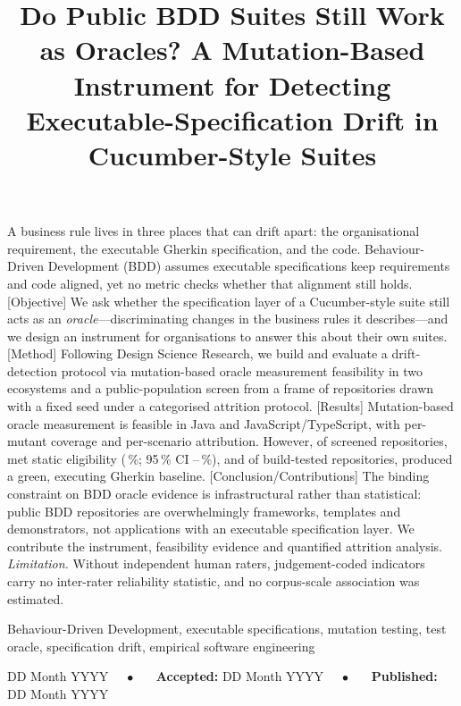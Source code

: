 \documentclass[english]{sbc2025}
\title[BDD Suites as Oracles]{Do Public BDD Suites Still Work as Oracles?
A Mutation-Based Instrument for Detecting Executable-Specification Drift in
Cucumber-Style Suites}
\author[Anonymous submission]{%
\affil{\textbf{Anonymous submission --- author identities withheld for review}}%
}
\renewcommand{\_}{\origtextunderscore\allowbreak}
\begin{document}
\begin{frontmatter}

\maketitle

\begin{abstract-en}
[Context] A business rule lives in three places that can drift apart: the organisational requirement,
the executable Gherkin specification, and the code. Behaviour-Driven Development (BDD) assumes
executable specifications keep requirements and code aligned, yet no metric checks whether that
alignment still holds. [Objective] We ask whether the specification layer of a Cucumber-style suite
still acts as an \emph{oracle}---discriminating changes in the business rules it describes---and we
design an instrument for organisations to answer this about their own suites. [Method] Following
Design Science Research, we build and evaluate a drift-detection protocol via mutation-based oracle
measurement feasibility in two ecosystems and a public-population screen from a frame of \Nframe{}
repositories drawn with a fixed seed under a categorised attrition protocol.
[Results] Mutation-based oracle measurement is feasible in Java and JavaScript/TypeScript, with
per-mutant coverage and per-scenario attribution. However, of \Nscreened{} screened repositories,
\Neligible{} met static eligibility (\YieldPct\,\%; 95\,\% CI \YieldLo--\YieldHi\,\%), and of
\Nbuildtested{} build-tested repositories, \Ngreen{} produced a green, executing Gherkin baseline.
[Conclusion/Contributions] The binding constraint on BDD oracle evidence is infrastructural rather
than statistical: public BDD repositories are overwhelmingly frameworks, templates and demonstrators,
not applications with an executable specification layer. We contribute the instrument, feasibility
evidence and quantified attrition analysis. \emph{Limitation.} Without independent human raters,
judgement-coded indicators carry no inter-rater reliability statistic, and no corpus-scale
association was estimated.
\end{abstract-en}

\begin{keywords}
Behaviour-Driven Development, executable specifications, mutation testing, test oracle, specification
drift, empirical software engineering
\end{keywords}

\begin{dates}
 DD Month YYYY~~~$\bullet$~~~
{\sffamily\textbf{Accepted:}} DD Month YYYY~~~$\bullet$~~~
{\sffamily\textbf{Published:}} DD Month YYYY
\end{dates}

\end{frontmatter}














\end{document}
